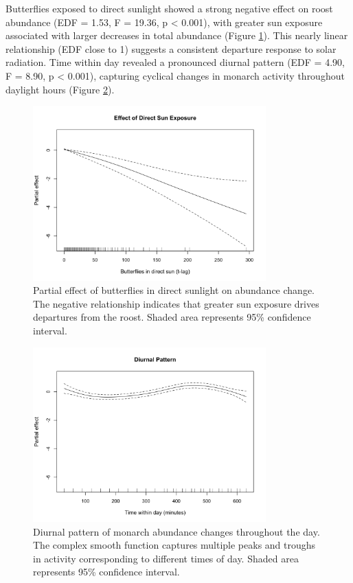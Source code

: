 Butterflies exposed to direct sunlight showed a strong negative effect on roost abundance (EDF = 1.53, F = 19.36, p < 0.001), with greater sun exposure associated with larger decreases in total abundance (Figure \ref{fig:effect_sun}). This nearly linear relationship (EDF close to 1) suggests a consistent departure response to solar radiation. Time within day revealed a pronounced diurnal pattern (EDF = 4.90, F = 8.90, p < 0.001), capturing cyclical changes in monarch activity throughout daylight hours (Figure \ref{fig:effect_diurnal}).

\begin{figure}[htbp]
\centering
\includegraphics[width=0.8\textwidth]{supplemental/results/thesis_exports/figures/effect_sun_exposure.png}
\caption{Partial effect of butterflies in direct sunlight on abundance change. The negative relationship indicates that greater sun exposure drives departures from the roost. Shaded area represents 95\% confidence interval.}
\label{fig:effect_sun}
\end{figure}

\begin{figure}[htbp]
\centering
\includegraphics[width=0.8\textwidth]{supplemental/results/thesis_exports/figures/effect_diurnal_pattern.png}
\caption{Diurnal pattern of monarch abundance changes throughout the day. The complex smooth function captures multiple peaks and troughs in activity corresponding to different times of day. Shaded area represents 95\% confidence interval.}
\label{fig:effect_diurnal}
\end{figure}

